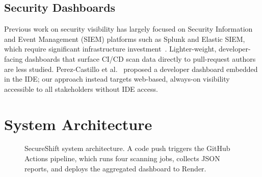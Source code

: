 \documentclass[10pt,conference]{IEEEtran}
\begin{document}
\subsection{Security Dashboards}

Previous work on security visibility has largely focused on Security Information
and Event Management (SIEM) platforms such as Splunk and Elastic SIEM, which
require significant infrastructure investment~\cite{siem2020}.
Lighter-weight, developer-facing dashboards that surface CI/CD scan data
directly to pull-request authors are less studied.
Perez-Castillo et al.~\cite{perez2021} proposed a developer dashboard embedded
in the IDE; our approach instead targets web-based, always-on visibility
accessible to all stakeholders without IDE access.

\section{System Architecture}

\begin{figure}[b]
  \centering
  \setlength{\fboxsep}{6pt}
  \caption{SecureShift system architecture. A code push triggers the GitHub
           Actions pipeline, which runs four scanning jobs, collects
           JSON reports, and deploys the aggregated dashboard to Render.}
  \label{fig:architecture}
\end{figure}
\end{document}
